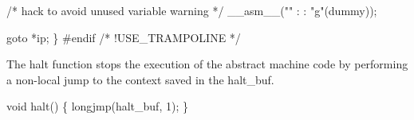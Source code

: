     /* hack to avoid unused variable warning */
    __asm__("" : : "g"(dummy));

    goto *ip;
\}
#endif /* !USE_TRAMPOLINE */

\nwendcode{}\nwdocspar
The {\Tt{}halt\nwendquote} function stops the execution of the abstract machine code
by performing a non-local jump to the context saved in the
{\Tt{}halt{\_}buf\nwendquote}.

\nwenddocs{}\plusendmoddef\nwstartdeflinemarkup{}\nwenddeflinemarkup
void
halt()
\{
    longjmp(halt_buf, 1);
\}
\nwendcode{}

%
%

